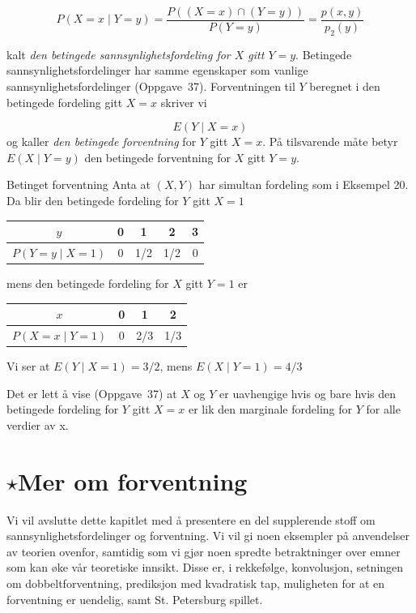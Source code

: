 \[ P(X=x \mid Y=y)=\frac{P((X=x)\cap (Y=y))}{P(Y=y)}=\frac{p(x,y)}{p_2(y)} \]

\noindent kalt {\em den betingede sannsynlighetsfordeling for $X$ gitt $Y=y$}.
Betingede sannsynlighetsfordelinger har samme egenskaper som
vanlige sannsynlighetsfordelinger (Oppgave~37). Forventningen til
$Y$ beregnet i den betingede fordeling gitt $X=x$ skriver vi

\[            E(Y\mid X=x)   \]
og kaller {\em den betingede forventning} for $Y$ gitt $X=x$. På
tilsvarende måte betyr $E(X\mid Y=y)$ den betingede forventning
for $X$ gitt $Y=y$. \\

\begin{eksempel}{Betinget forventning}
Anta at $(X,Y)$ har simultan fordeling som i Eksempel 20. Da blir
den betingede fordeling for $Y$ gitt $X=1$

\begin{center}
 \begin{tabular}{c|cccc}
 $y$& 0 & 1 & 2 & 3 \\ \hline
 $P(Y=y \mid X=1)$& 0 &1/2&1/2&0
 \end{tabular}
\end{center}
\noindent mens den betingede fordeling for $X$ gitt $Y=1$ er
\begin{center}
 \begin{tabular}{c|ccc}
 $x$& 0 & 1 & 2  \\ \hline
 $P(X=x \mid Y=1)$& 0 &2/3&1/3
 \end{tabular}
\end{center}
\noindent Vi ser at $E(Y\mid X=1)=3/2$, mens $E(X\mid Y=1)=4/3$
\end{eksempel}
                                                          
Det er lett å vise (Oppgave~37) at $X$ og $Y$ er uavhengige hvis
og bare hvis den betingede fordeling for $Y$ gitt $X=x$ er lik
den marginale fordeling for $Y$ for alle verdier av x.

                    

\section{$\star$Mer om forventning}
\small
Vi vil avslutte dette kapitlet med å presentere en del
supplerende stoff om sannsynlighetsfordelinger og forventning. Vi
vil gi noen eksempler på anvendelser av teorien ovenfor, samtidig
som vi gjør noen spredte betraktninger over emner som kan øke vår
teoretiske innsikt. Disse er, i rekkefølge, konvolusjon,
setningen om dobbeltforventning, prediksjon med kvadratisk tap,
muligheten for at en forventning er uendelig, samt St. Petersburg
spillet. \\

